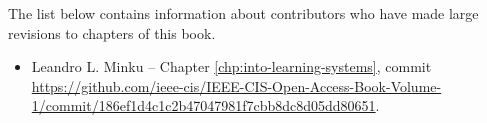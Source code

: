 
\contributors

The list below contains information about contributors who have made large revisions to chapters of this book.

\begin{itemize}
\item Leandro L. Minku -- Chapter \ref{chp:into-learning-systems}, commit \url{https://github.com/ieee-cis/IEEE-CIS-Open-Access-Book-Volume-1/commit/186ef1d4c1c2b47047981f7cbb8dc8d05dd80651}.
\end{itemize}
